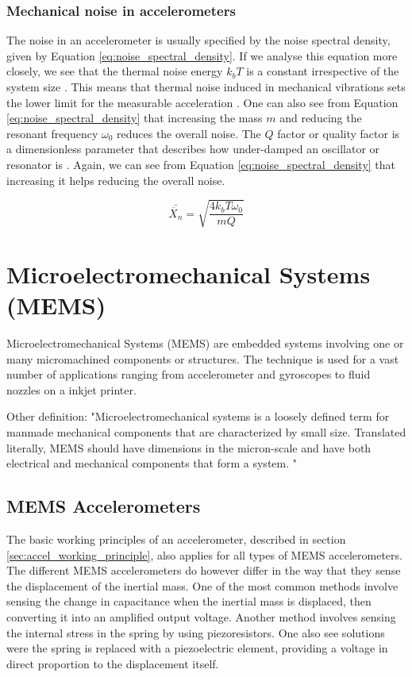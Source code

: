 \subsubsection{Mechanical noise in accelerometers}

The noise in an accelerometer is usually specified by the noise spectral density, given by Equation \ref{eq:noise_spectral_density}. If we analyse this equation more closely, we see that the thermal noise energy $k_b T$ is a constant irrespective of the system size \cite[~p.13]{kaajakari09}. This means that thermal noise induced in mechanical vibrations sets the lower limit for the measurable acceleration \cite[~p.41]{kaajakari09}. One can also see from Equation \ref{eq:noise_spectral_density} that increasing the mass $m$ and reducing the resonant frequency $\omega_0$ reduces the overall noise. The $Q$ factor or quality factor is a dimensionless parameter that describes how under-damped an oscillator or resonator is \cite{resonance}. Again, we can see from Equation \ref{eq:noise_spectral_density} that increasing it helps reducing the overall noise.

\begin{equation}
\bar{\ddot{X_n}} = \sqrt{\frac{4 k_b T \omega_0}{mQ}}
\label{eq:noise_spectral_density}
\end{equation}

\section{Microelectromechanical Systems (MEMS)}

Microelectromechanical Systems (MEMS) are embedded systems involving one or many micromachined components or structures\cite[p.~3]{maluf04}. The technique is used for a vast number of applications ranging from accelerometer and gyroscopes to fluid nozzles on a inkjet printer.

Other definition: "Microelectromechanical systems is a loosely defined term for manmade mechanical components that are characterized by small size. Translated literally, MEMS should have dimensions in the micron-scale and have both electrical and mechanical components that form a system. "

\subsection{MEMS Accelerometers}

The basic working principles of an accelerometer, described in section \ref{sec:accel_working_principle}, also applies for all types of MEMS accelerometers. The different MEMS accelerometers do however differ in the way that they sense the displacement of the inertial mass. One of the most common methods involve sensing the change in capacitance when the inertial mass is displaced, then converting it into an amplified output voltage. Another method involves sensing the internal stress in the spring by using piezoresistors. One also see solutions were the spring is replaced with a piezoelectric element, providing a voltage in direct proportion to the displacement itself.

